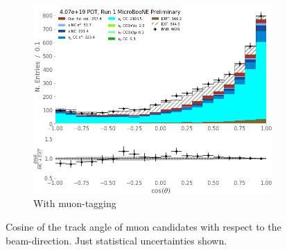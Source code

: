\begin{figure}[H]
\begin{center}
\begin{subfigure}[b]{0.3\textwidth}
    \end{subfigure} %
    \begin{subfigure}[b]{0.3\textwidth}
    \centering
    \includegraphics[width=1.00\textwidth]{NuMuCCsel/Images/Ryan/Run1_costheta_fullsel.jpg}
    \caption{\label{fig:NuMUCCsel:ryan:trklenFull} With muon-tagging}
    \end{subfigure}
\caption{Cosine of the track angle of muon candidates with respect to the beam-direction. Just statistical uncertainties shown.}
\end{center}
\end{figure}

